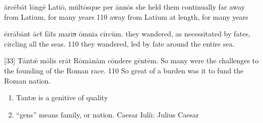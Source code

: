 \latline
{\=arc\={\macron e}b\=at l\=ong\={\macron e} L\-at\-i\={\macron o}, m\=ult\={\macron o}squ\-e p\-er \=ann\={\macron o}s}
{she held them continually far away from Latium, for many years }
{110}
{away from Latium at length, for many years}
{}

\latline
{\=err\={\macron a}b\=ant \={\macron a}ct\={\macron{\i}} f\={\macron a}t\={\macron{\i}}s m\-ar\-i\sout{a }\=omn\-i\-a c\=irc\=um.}
{they wandered, as necessitated by fates, circling all the seas.}
{110}
{they wandered, led by fate around the entire sea.}
{}

\latline
{[33] T\=ant\={\ae} m\={\macron o}l\-is \-er\=at R\={\macron o}m\={\macron a}n\=am c\=ond\-er\-e g\=ent\=em.}
{So many were the challenges to the founding of the Roman race.}
{110}
{So great of a burden was it to fund the Roman nation.}
{
\begin{enumerate}
	\item Tant{\ae} is a genitive of quality
	\item ``gens'' means family, or nation.  Caesar Iuli\={\i}:  Julius Caesar
\end{enumerate}
}
